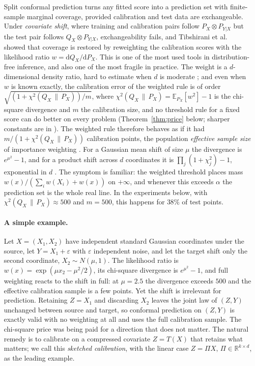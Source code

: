 \documentclass[11pt,a4paper]{article}
\newcommand{\PX}{P_X}
\newcommand{\QX}{Q_X}
\newcommand{\chisq}{\chi^2(\QX\,\|\,\PX)}
\newcommand{\E}{\mathbb{E}}
\newcommand{\R}{\mathbb{R}}
\theoremstyle{plain}
\theoremstyle{definition}
\theoremstyle{remark}
\begin{document}
Split conformal prediction \cite{papadopoulos2002,vovk2005} turns any fitted score into a prediction set with finite-sample marginal coverage, provided calibration and test data are exchangeable. Under \emph{covariate shift}, where training and calibration pairs follow $\PX\otimes P_{Y|X}$ but the test pair follows $\QX\otimes P_{Y|X}$, exchangeability fails, and Tibshirani et al.\ \cite{tibshirani2019} showed that coverage is restored by reweighting the calibration scores with the likelihood ratio $w=\mathrm d\QX/\mathrm d\PX$. This is one of the most used tools in distribution-free inference, and also one of the most fragile in practice. The weight is a $d$-dimensional density ratio, hard to estimate when $d$ is moderate \cite{sugiyama2012}; and even when $w$ is known exactly, the calibration error of the weighted rule is of order $\sqrt{(1+\chisq)/m}$, where $\chisq=\E_{\PX}[w^2]-1$ is the chi-square divergence and $m$ the calibration size, and no threshold rule for a fixed score can do better on every problem (Theorem~\ref{thm:price} below; sharper constants are in \cite{isaev2026,pournaderi2026}). The weighted rule therefore behaves as if it had $m/(1+\chisq)$ calibration points, the population \emph{effective sample size} of importance weighting \cite{polo2022,gretton2009}. For a Gaussian mean shift of size $\mu$ the divergence is $e^{\mu^2}-1$, and for a product shift across $d$ coordinates it is $\prod_j(1+\chi^2_j)-1$, exponential in $d$ \cite[Sec.\ 4.1]{polo2022}. The symptom is familiar: the weighted threshold places mass $w(x)/(\sum_iw(X_i)+w(x))$ on $+\infty$, and whenever this exceeds $\alpha$ the prediction set is the whole real line. In the experiments below, with $\chisq\approx500$ and $m=500$, this happens for $38\%$ of test points.

\paragraph{A simple example.}
Let $X=(X_1,X_2)$ have independent standard Gaussian coordinates under the source, let $Y=X_1+\varepsilon$ with $\varepsilon$ independent noise, and let the target shift only the second coordinate, $X_2\sim N(\mu,1)$. The likelihood ratio is $w(x)=\exp(\mu x_2-\mu^2/2)$, its chi-square divergence is $e^{\mu^2}-1$, and full weighting reacts to the shift in full: at $\mu=2.5$ the divergence exceeds $500$ and the effective calibration sample is a few points. Yet the shift is irrelevant for prediction. Retaining $Z=X_1$ and discarding $X_2$ leaves the joint law of $(Z,Y)$ unchanged between source and target, so conformal prediction on $(Z,Y)$ is exactly valid with no weighting at all and uses the full calibration sample. The chi-square price was being paid for a direction that does not matter. The natural remedy is to calibrate on a compressed covariate $Z=T(X)$ that retains what matters; we call this \emph{sketched calibration}, with the linear case $Z=\Pi X$, $\Pi\in\R^{k\times d}$, as the leading example.
\end{document}
